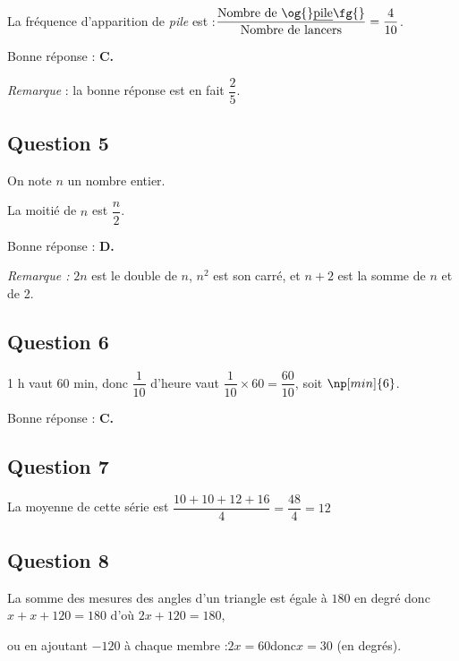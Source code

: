 \documentclass[12pt,a4paper,french]{article}
\begin{document}
La fréquence d'apparition de \og \emph{pile} \fg{} est :\quad  $\dfrac{\text{Nombre de \og{}\emph{pile}\fg{}}}{\text{Nombre de lancers}} = \dfrac{4}{10}$.

Bonne réponse : \textbf{C.}

\emph{Remarque} : la \og bonne \fg{} réponse est en fait $\dfrac25$.

\subsection*{Question 5}

On note $n$ un nombre entier.

La moitié de $n$ est $\dfrac{n}{2}$.

Bonne réponse : \textbf{D.}

\emph{Remarque :} $2n$ est le double de $n$, $n^2$ est son carré, et $n+2$ est la somme de $n$ et de 2.

\subsection*{Question 6}

1 h vaut 60 min, donc $\dfrac{1}{10}$ d'heure vaut $\dfrac{1}{10}\times 60 = \dfrac{60}{10}$, soit  $\np[min]{6}$.

Bonne réponse : \textbf{C.}


\subsection*{Question 7}

La moyenne de cette série est $\dfrac{10+10+12+16}{4} = \dfrac{48}{4} = {12}$

\subsection*{Question 8}

La somme des mesures des angles d'un triangle est égale à $180$ en degré donc \quad
$x+x+120 = 180$ \quad d'où \quad $2x+120 = 180$,

ou en ajoutant $- 120$ à chaque membre :\quad $2x = 60$\quad donc\quad $x = 30$ (en degrés).
\end{document}
